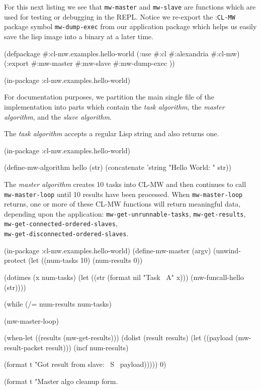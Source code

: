 \documentclass[titlepage,12pt]{book}
\newcommand{\xsmall}{\latexhtml{\small}{}}
\newcommand{\xnormalsize}{\latexhtml{\normalsize}{}}
\newcommand{\clmw}{\xsmall\textsc{CL-MW}\xnormalsize\xspace}
\newcommand{\package}[1]{\mbox{:\uppercase{\xsmall\texttt{#1}\xnormalsize}} package\xspace}
\newcommand{\mwpackage}{\package{CL-MW}}
\newcommand{\sa}{\textit{slave algorithm}\xspace}
\newcommand{\ma}{\textit{master algorithm}\xspace}
\newcommand{\ta}{\textit{task algorithm}\xspace}
\newcommand{\func}[1]{\mbox{\texttt{#1}}\xspace}
\newcommand{\file}[1]{\texttt{#1}\xspace}
\newcommand{\bold}[1]{\textbf{#1}\xspace}
\begin{document}
For this next listing we see that \func{mw-master} and \func{mw-slave}
are functions which are used for testing or debugging in the
REPL. Notice we re-export the \mwpackage symbol \func{mw-dump-exec}
from our application package which helps us easily save the lisp image
into a binary at a later time.

\begin{lisp}[caption=\file{package.lisp}]
(defpackage #:cl-mw.examples.hello-world
  (:use #:cl #:alexandria #:cl-mw)
  (:export #:mw-master
           #:mw-slave
           #:mw-dump-exec ))

(in-package :cl-mw.examples.hello-world)
\end{lisp}

For documentation purposes, we partition the main single file of the
implementation into parts which contain the \ta, the \ma, and the \sa.

The \ta accepts a regular Lisp string and also returns one.

\begin{lisp}[caption=\file{hello-world.lisp: \bold{Part 1 of 4}}]
(in-package :cl-mw.examples.hello-world)

(define-mw-algorithm hello (str)
  (concatenate 'string "Hello World: " str))
\end{lisp}

The \ma creates 10 tasks into \clmw and then continues
to call \func{mw-master-loop} until 10 results have been
processed.  When \func{mw-master-loop} returns, one or
more of these \clmw functions will return meaningful data,
depending upon the application: \func{mw-get-unrunnable-tasks},
\func{mw-get-results}, \func{mw-get-connected-ordered-slaves},\\
\func{mw-get-disconnected-ordered-slaves}.

\begin{lisp}[caption=\file{hello-world.lisp: \bold{Part 2 of 4}}]
(in-package :cl-mw.examples.hello-world)
(define-mw-master (argv)
    (unwind-protect
         (let ((num-tasks 10)
               (num-results 0))

           (dotimes (x num-tasks)
             (let ((str (format nil "Task ~A" x)))
               (mw-funcall-hello (str))))

           (while (/= num-results num-tasks)

             (mw-master-loop)

             (when-let ((results (mw-get-results)))
               (dolist (result results)
                 (let ((payload (mw-result-packet result)))
                   (incf num-results)

                   (format t "Got result from slave: ~S~%
                           payload)))))
           0)

      (format t "Master algo cleanup form.~%
\end{lisp}
\end{document}

